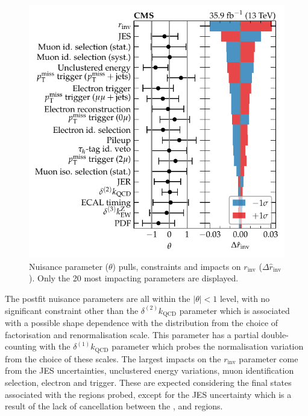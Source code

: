 \begin{figure}
    \centering
    \includegraphics{chapters/043_results/images/finalfit-impacts.pdf}
    \caption[Nuisance parameters after a fit to the data between the signal and control regions.]{
        Nuisance parameter ($\theta$) pulls, constraints and impacts on $r_{\mathrm{inv}}$ ($\Delta \hat{r}_{\mathrm{inv}}$). Only the 20 most impacting parameters are displayed.
    }
    \label{fig:finalfit-impacts}
\end{figure}
%
The postfit nuisance parameters are all within the $|\theta|<1$ level, with no significant constraint other than the $\delta^{(2)}k_{\mathrm{QCD}}$ parameter which is associated with a possible shape dependence with the \recoil distribution from the choice of factorisation and renormalisation scale. This parameter has a partial double-counting with the $\delta^{(1)}k_{\mathrm{QCD}}$ parameter which probes the normalisation variation from the choice of these scales. The largest impacts on the $r_{\mathrm{inv}}$ parameter come from the JES uncertainties, unclustered energy variations, muon identification selection, electron and \ptmiss trigger. These are expected considering the final states associated with the regions probed, except for the JES uncertainty which is a result of the lack of cancellation between the \metplusjets, \ellplusjets and \diellplusjets regions.

